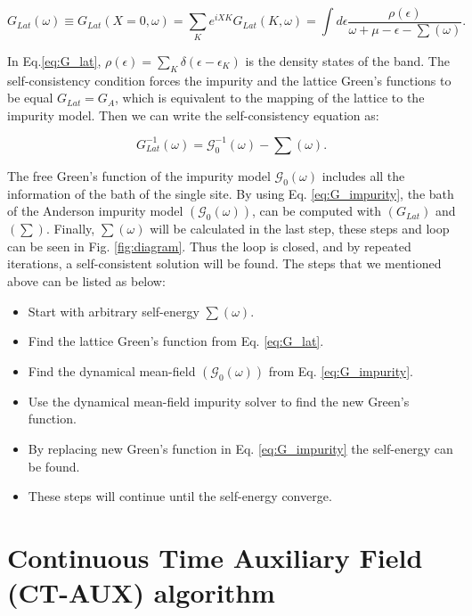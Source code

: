 \begin{equation}
    G_{Lat} (\omega) \equiv G_{Lat} (X=0, \omega) = \sum _K e^{iXK} G_{Lat} (K,\omega) = \int d\epsilon \frac{\rho (\epsilon)}{\omega+\mu-\epsilon-\sum(\omega)}.
    \label{eq:G_lat}
\end{equation}

In Eq.\ref{eq:G_lat}, $\rho (\epsilon) = \sum_{K} \delta (\epsilon - \epsilon_{K})$ is the density states of the band. The self-consistency condition forces the impurity and the lattice Green's functions to be equal $G_{Lat}= G_A $, 
which is equivalent to the mapping of the lattice to the impurity model. Then we can write the self-consistency equation as:

\begin{equation}
    G_{Lat}^{-1} (\omega) = \mathcal{G}_0^{-1}(\omega) -\sum (\omega).
    \label{eq:G_impurity}
\end{equation}

The free Green's function of the impurity model $\mathcal{G}_0(\omega)$ includes all the information of the bath of the single site. By using Eq. \ref{eq:G_impurity}, the bath of the Anderson impurity model $(\mathcal{G}_0(\omega))$, can be computed with $(G_{Lat})$ and $(\sum)$. Finally, $\sum (\omega)$ will be calculated in the last step, these steps and loop can be seen in Fig. \ref{fig:diagram}. Thus the loop is closed, and by repeated iterations, a self-consistent solution will be found. The steps that we mentioned above can be listed as below: 
\begin{itemize}
    \item Start with arbitrary self-energy $\sum (\omega)$.
    \item Find the lattice Green's function from Eq. \ref{eq:G_lat}.
    \item Find the dynamical mean-field $(\mathcal{G}_0(\omega))$ from Eq. \ref{eq:G_impurity}. 
    \item Use the dynamical mean-field impurity solver to find the new Green's function.
    \item By replacing new Green's function in Eq. \ref{eq:G_impurity} the self-energy can be found.
    \item These steps will continue until the self-energy converge.
\end{itemize}

\section{Continuous Time Auxiliary Field (CT-AUX) algorithm}


